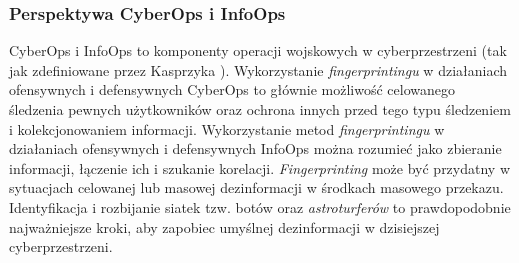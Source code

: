 \subsubsection{Perspektywa CyberOps i InfoOps}
CyberOps i InfoOps to komponenty operacji wojskowych w cyberprzestrzeni (tak jak
zdefiniowane przez Kasprzyka \cite{kasprzyk2020mathematical}). Wykorzystanie
\emph{fingerprintingu} w działaniach ofensywnych i defensywnych CyberOps to
głównie możliwość celowanego śledzenia pewnych użytkowników oraz ochrona innych
przed tego typu śledzeniem i kolekcjonowaniem informacji. Wykorzystanie metod
\emph{fingerprintingu} w działaniach ofensywnych i defensywnych InfoOps można
rozumieć jako zbieranie informacji, łączenie ich i szukanie korelacji.
\emph{Fingerprinting} może być przydatny w sytuacjach celowanej lub masowej
dezinformacji w środkach masowego przekazu. Identyfikacja i rozbijanie siatek
tzw. botów oraz \emph{astroturferów} to prawdopodobnie najważniejsze kroki, aby
zapobiec umyślnej dezinformacji w dzisiejszej cyberprzestrzeni.
